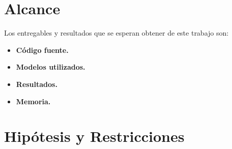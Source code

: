 \section{Alcance}
Los entregables y resultados que se esperan obtener de este trabajo son:
\begin{itemize}
    \item \textbf{Código fuente.}
    \item \textbf{Modelos utilizados.}
    \item \textbf{Resultados.} 
    \item \textbf{Memoria.}
\end{itemize}

\section{Hipótesis y Restricciones}


